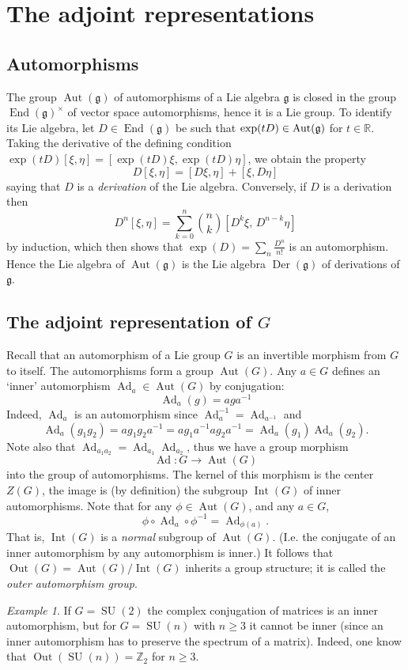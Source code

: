 \documentclass{article}
\theoremstyle{remark}
\newtheorem{exercise}[theorem]{Exercise}
\newtheorem{example}[theorem]{Example}
\newcommand{\R}{\mathbb{R}}
\newcommand{\Z}{\mathbb{Z}}
\newcommand\lie[1]{\mathfrak{#1}}
\newcommand{\g}{\lie{g}}
\newcommand{\on}{\operatorname}
\newcommand{\Ad}{ \on{Ad} }
\newcommand{\End}{ \on{End} }
\newcommand{\SU}{ \on{SU}}
\newcommand{\SO}{ \on{SO}}
\newcommand{\f}{\frac}
\newcommand{\mf}{\mathfrak}
\begin{document}
\section{The adjoint representations}
%
\subsection{Automorphisms}

The group $\on{Aut}(\g)$ of automorphisms of a Lie algebra $\g$ is closed in the
group $\End(\g)^\times$ of vector space automorphisms, hence it is a
Lie group. To identify its Lie algebra, let $D\in \End(\g)$ be such that $\exp(tD)\in \Aut(\g)$ for 
$t\in\R$. Taking the derivative of the defining condition 
$\exp(tD)[\xi,\eta]=[\exp(tD)\xi,\exp(tD)\eta]$, we obtain the property 
\[ D[\xi,\eta]=[D\xi,\eta]+[\xi,D\eta]\]
saying that $D$ is a \emph{derivation} of the Lie algebra. Conversely, if 
$D$ is a derivation then 
\[ D^n[\xi,\eta]=\sum_{k=0}^n \binom{n}{k} [D^k \xi,\,D^{n-k}\eta]\]
by induction, which then shows that $\exp(D)=\sum_n \f{D^n}{n!}$ is an automorphism. 
Hence the Lie algebra of $\on{Aut}(\g)$ is the Lie algebra $\on{Der}(\g)$ of derivations 
of $\g$. 

\subsection{The adjoint representation of $G$}
%
Recall that an automorphism of a Lie group $G$ is an invertible morphism 
from $G$ to itself. The automorphisms form a group $\on{Aut}(G)$. 
Any $a\in G$ defines an `inner' automorphism $\Ad_a\in \on{Aut}(G)$ 
by conjugation: 
%
\[ \Ad_a(g)=aga^{-1}\]
%
Indeed, $\Ad_a$ is an automorphism since $\Ad_a^{-1}=\Ad_{a^{-1}}$ and 
% 
\[ \Ad_a(g_1g_2)= ag_1g_2 a^{-1}=ag_1 a^{-1}ag_2
a^{-1}=\Ad_a(g_1)\Ad_a(g_2).\] 
%
Note also that $\Ad_{a_1 a_2}=\Ad_{a_1}\Ad_{a_2}$, thus we have a 
group morphism 
\[ \Ad\colon G\to \on{Aut}(G)\] 
%
into the group of automorphisms. The kernel of this morphism is the center $Z(G)$, 
the image is (by definition) the subgroup $\on{Int}(G)$ of inner 
automorphisms. Note that for any $\phi\in \on{Aut}(G)$, and any $a\in G$, 
\[ \phi\circ \Ad_a\circ \phi^{-1}=\Ad_{\phi(a)}.\]
That is, $\on{Int}(G)$ is a \emph{normal} subgroup of $\on{Aut}(G)$. 
(I.e. the conjugate of an inner automorphism by any automorphism is inner.) 
It follows that $\on{Out}(G)=\on{Aut}(G)/\on{Int}(G)$ inherits a group 
structure; it is called the \emph{outer automorphism group}.  
\begin{example}
If $G=\SU(2)$ the complex conjugation of matrices is an inner automorphism, but for $G=\SU(n)$ with $n\ge 3$ it 
cannot be inner (since an inner automorphism has to preserve the 
spectrum of a matrix). Indeed, one know that $\on{Out}(\SU(n))=\Z_2$ for $n\ge 3$. 
\end{example}
\end{document}
